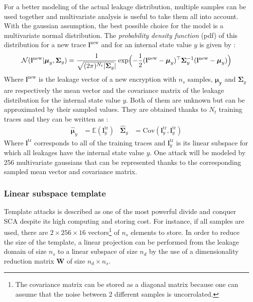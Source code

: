 For a better modeling of the actual leakage distribution, multiple samples 
can be used together and multivariate analysis is useful to take them all 
into account. With the gaussian assumption, the best possible choice for 
the model is a multivariate normal distribution. The \textit{probability 
density function} (pdf) of this distribution for a new trace 
$\mathbf{l}^{\text{new}}$ and for an internal state value $y$ is given by 
:
\begin{equation*}
    
\mathcal{N}(\mathbf{l}^{\text{new}}|\boldsymbol{\mu}_y,\mathbf{\Sigma}_y)=\frac{1}{\sqrt{(2\pi)^{N_t}|\mathbf{\Sigma}_y}|}\exp\Bigl({-\frac{1}{2}(\mathbf{l}^{\text{new}}-\boldsymbol{\mu}_y})^\top 
\mathbf{\Sigma}_y^{-1} (\mathbf{l}^{\text{new}}-\boldsymbol{\mu}_y)  
\Bigr)
\end{equation*}
Where $\mathbf{l}^{\text{new}}$ is the leakage vector of a new encryption 
with $n_{s}$ samples, $\boldsymbol{\mu_y}$ and $\mathbf{\Sigma}_y$ are 
respectively the mean vector and the covariance matrix of the leakage 
distribution for the internal state value $y$. Both of them are unknown 
but can be approximated by their sampled values. They are obtained thanks 
to $N_t$ training traces and they can be written as  : 
\begin{align*}
\hat{\boldsymbol{\mu}}_y &= \mathbb{E}(\mathbf{l}_y^{\text{tr}})  &   
\hat{\boldsymbol{\Sigma}}_y &= 
\mathrm{Cov}(\mathbf{l}_y^{\text{tr}},\mathbf{l}_y^{\text{tr}})
\end{align*}
Where $\mathbf{l}^{\text{tr}}$ corresponds to all of the training traces 
and  $\mathbf{l}_y^{\text{tr}}$ is its linear subspace for which all 
leakages have the internal state value $y$. One attack will be modeled by 
256 multivariate gaussians that can be represented thanks to the 
corresponding sampled mean vector and covariance matrix.


\subsubsection{Linear subspace template}
Template attacks is described as one of the most powerful divide and 
conquer SCA \cite{template,efficient_template} despite its high computing 
and storing cost. For instance, if all samples are used, there are $2 
\times 256 \times 16 $ vectors\footnote{The covariance matrix can be 
stored as a diagonal matrix because one can assume that the noise between 
2 different samples is uncorrolated.} of $n_s$ elements to store. In order 
to reduce the size of the template, a linear projection can be performed 
from the leakage domain of size $n_s$ to a linear subspace of size $n_d$ 
by the use of a dimensionality reduction matrix $\mathbf{W}$ of size 
$n_d\times n_s$.\\


